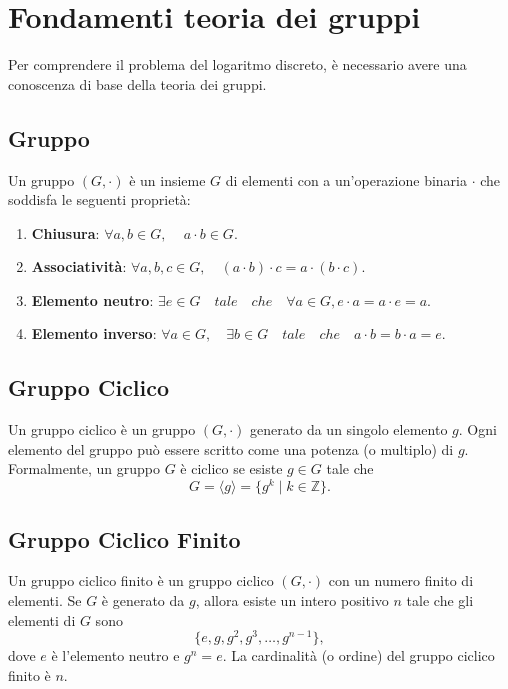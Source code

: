\documentclass[a4paper,12pt]{report}
\begin{document}
\section{Fondamenti teoria dei gruppi}
Per comprendere il problema del logaritmo discreto, è necessario avere una conoscenza di base della teoria dei gruppi.

\subsection*{Gruppo}

Un gruppo \( (G, \cdot) \) è un insieme \( G \) di elementi con a un'operazione binaria \( \cdot \) che soddisfa le seguenti proprietà:

\begin{enumerate}
    \item \textbf{Chiusura}: \(\forall a, b \in G, \, \quad a \cdot b \in G.\)
    \item \textbf{Associatività}: \(\forall a, b, c \in G, \quad (a \cdot b) \cdot c = a \cdot (b \cdot c).\)
    \item \textbf{Elemento neutro}: \(\exists e \in G \quad tale \quad che \quad \forall a \in G, e \cdot a = a \cdot e = a.\)
    \item \textbf{Elemento inverso}: \(\forall a \in G, \quad \exists b \in G \quad tale \quad che \quad a \cdot b = b \cdot a = e.\)
\end{enumerate}

\subsection*{Gruppo Ciclico}

Un gruppo ciclico è un gruppo \( (G, \cdot) \) generato da un singolo elemento \( g \). Ogni elemento del gruppo può essere scritto come una potenza (o multiplo) di \( g \). Formalmente, un gruppo \( G \) è ciclico se esiste \( g \in G \) tale che
\[G = \langle g \rangle = \{ g^k \mid k \in \mathbb{Z} \}.\]

\subsection*{Gruppo Ciclico Finito}

Un gruppo ciclico finito è un gruppo ciclico \( (G, \cdot) \) con un numero finito di elementi. Se \( G \) è generato da \( g \), allora esiste un intero positivo \( n \) tale che gli elementi di \( G \) sono
\[\{e, g, g^2, g^3, \ldots, g^{n-1}\},\]
dove \( e \) è l'elemento neutro e \( g^n = e \). La cardinalità (o ordine) del gruppo ciclico finito è \( n \).
\end{document}
